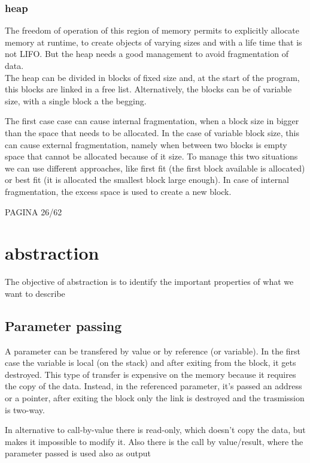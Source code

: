 \documentclass[12pt, a4paper]{article}
\begin{document}
\subsubsection{heap}
The freedom of operation of this region of memory permits to explicitly allocate memory at runtime, to create 
objects of varying sizes and with a life time that is not LIFO. But the heap needs a good management to avoid 
fragmentation of data.\\The heap can be divided in blocks of fixed size and, at the start of the program, this blocks 
are linked in a free list. Alternatively, the blocks can be of variable size, with a single block a the begging.

The first case case can cause internal fragmentation, when a block size in bigger than the space that needs to be 
allocated. In the case of variable block size, this can cause external fragmentation, namely when between two blocks
is empty space that cannot be allocated because of it size. To manage this two situations we can use different 
approaches, like first fit (the first block available is allocated) or best fit (it is allocated the smallest block
large enough). In case of internal fragmentation, the excess space is used to create a new block.

PAGINA 26/62

\newpage
\section{abstraction}
The objective of abstraction is to identify the important properties of what we want to describe

\subsection{Parameter passing}
A parameter can be transfered by value or by reference (or variable). In the first case the variable is local (on
the stack) and after exiting from the block, it gets destroyed. This type of transfer is expensive on the memory 
because it requires the copy of the data. Instead, in the referenced parameter, it's passed an address or a pointer,
after exiting the block only the link is destroyed and the trasmission is two-way. 

In alternative to call-by-value there is read-only, which doesn't copy the data, but makes it impossible to modify it.
Also there is the call by value/result, where the parameter passed is used also as output
\end{document}

